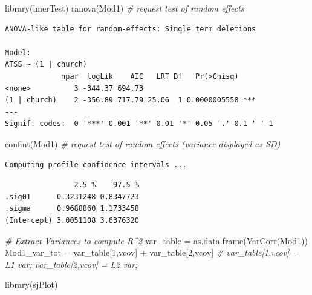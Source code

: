 \documentclass[
  english,
]{book}
\newenvironment{Shaded}{\begin{snugshade}}{\end{snugshade}}
\newcommand{\CommentTok}[1]{\textcolor[rgb]{0.56,0.35,0.01}{\textit{#1}}}
\newcommand{\DecValTok}[1]{\textcolor[rgb]{0.00,0.00,0.81}{#1}}
\newcommand{\FunctionTok}[1]{\textcolor[rgb]{0.00,0.00,0.00}{#1}}
\newcommand{\NormalTok}[1]{#1}
\newcommand{\OtherTok}[1]{\textcolor[rgb]{0.56,0.35,0.01}{#1}}
\newcommand{\SpecialCharTok}[1]{\textcolor[rgb]{0.00,0.00,0.00}{#1}}
\newcommand{\StringTok}[1]{\textcolor[rgb]{0.31,0.60,0.02}{#1}}
\begin{document}
\begin{Shaded}
\begin{Highlighting}[]
\FunctionTok{library}\NormalTok{(lmerTest)}
\FunctionTok{ranova}\NormalTok{(Mod1) }\CommentTok{\# request test of random effects}
\end{Highlighting}
\end{Shaded}

\begin{verbatim}
ANOVA-like table for random-effects: Single term deletions

Model:
ATSS ~ (1 | church)
             npar  logLik    AIC   LRT Df   Pr(>Chisq)    
<none>          3 -344.37 694.73                          
(1 | church)    2 -356.89 717.79 25.06  1 0.0000005558 ***
---
Signif. codes:  0 '***' 0.001 '**' 0.01 '*' 0.05 '.' 0.1 ' ' 1
\end{verbatim}

\begin{Shaded}
\begin{Highlighting}[]
\FunctionTok{confint}\NormalTok{(Mod1) }\CommentTok{\# request test of random effects (variance displayed as SD)}
\end{Highlighting}
\end{Shaded}

\begin{verbatim}
Computing profile confidence intervals ...
\end{verbatim}

\begin{verbatim}
                2.5 %    97.5 %
.sig01      0.3231248 0.8347723
.sigma      0.9688860 1.1733458
(Intercept) 3.0051108 3.6376320
\end{verbatim}

\begin{Shaded}
\begin{Highlighting}[]
\CommentTok{\# Extract Variances to compute R\^{}2}
\NormalTok{  var\_table }\OtherTok{=} \FunctionTok{as.data.frame}\NormalTok{(}\FunctionTok{VarCorr}\NormalTok{(Mod1))}
\NormalTok{  Mod1\_var\_tot }\OtherTok{=}\NormalTok{ var\_table[}\DecValTok{1}\NormalTok{,}\StringTok{\textquotesingle{}vcov\textquotesingle{}}\NormalTok{] }\SpecialCharTok{+}\NormalTok{ var\_table[}\DecValTok{2}\NormalTok{,}\StringTok{\textquotesingle{}vcov\textquotesingle{}}\NormalTok{] }\CommentTok{\# var\_table[1,\textquotesingle{}vcov\textquotesingle{}] = L1 var; var\_table[2,\textquotesingle{}vcov\textquotesingle{}] = L2 var;  }

\FunctionTok{library}\NormalTok{(sjPlot)}
\end{Highlighting}
\end{Shaded}
\end{document}

